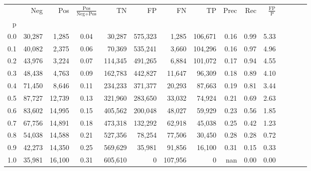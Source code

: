 \begin{tabular}{rrrcrrrrrrrrrrr}
\toprule
{} &     Neg &     Pos & $\frac{\text{Pos}}{\text{Neg}+\text{Pos}}$ &       TN &       FP &       FN &       TP &  Prec &   Rec & $\frac{\text{FP}}{\text{P}}$ \\
p   &         &         &                                            &          &          &          &          &       &       &                              \\
\midrule
0.0 &  30,287 &   1,285 &                                       0.04 &   30,287 &  575,323 &    1,285 &  106,671 &  0.16 &  0.99 &                         5.33 \\
0.1 &  40,082 &   2,375 &                                       0.06 &   70,369 &  535,241 &    3,660 &  104,296 &  0.16 &  0.97 &                         4.96 \\
0.2 &  43,976 &   3,224 &                                       0.07 &  114,345 &  491,265 &    6,884 &  101,072 &  0.17 &  0.94 &                         4.55 \\
0.3 &  48,438 &   4,763 &                                       0.09 &  162,783 &  442,827 &   11,647 &   96,309 &  0.18 &  0.89 &                         4.10 \\
0.4 &  71,450 &   8,646 &                                       0.11 &  234,233 &  371,377 &   20,293 &   87,663 &  0.19 &  0.81 &                         3.44 \\
0.5 &  87,727 &  12,739 &                                       0.13 &  321,960 &  283,650 &   33,032 &   74,924 &  0.21 &  0.69 &                         2.63 \\
0.6 &  83,602 &  14,995 &                                       0.15 &  405,562 &  200,048 &   48,027 &   59,929 &  0.23 &  0.56 &                         1.85 \\
0.7 &  67,756 &  14,891 &                                       0.18 &  473,318 &  132,292 &   62,918 &   45,038 &  0.25 &  0.42 &                         1.23 \\
0.8 &  54,038 &  14,588 &                                       0.21 &  527,356 &   78,254 &   77,506 &   30,450 &  0.28 &  0.28 &                         0.72 \\
0.9 &  42,273 &  14,350 &                                       0.25 &  569,629 &   35,981 &   91,856 &   16,100 &  0.31 &  0.15 &                         0.33 \\
1.0 &  35,981 &  16,100 &                                       0.31 &  605,610 &        0 &  107,956 &        0 &   nan &  0.00 &                         0.00 \\
\bottomrule
\end{tabular}
